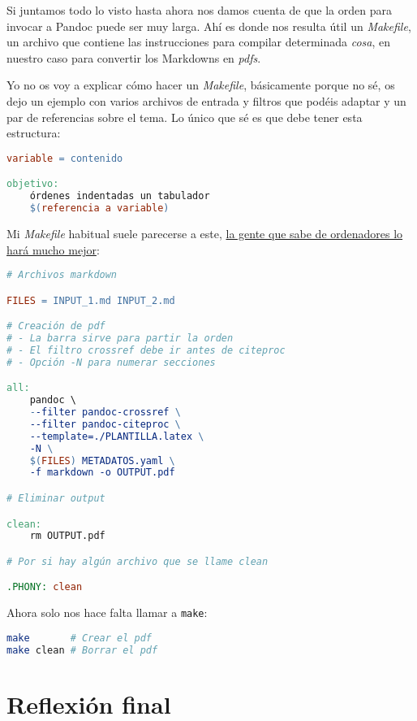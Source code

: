 Si juntamos todo lo visto hasta ahora nos damos cuenta de que la orden
para invocar a Pandoc puede ser muy larga. Ahí es donde nos resulta útil
un \emph{Makefile}, un archivo que contiene las instrucciones para
compilar determinada \emph{cosa}, en nuestro caso para convertir los
Markdowns en \emph{pdfs}.

Yo no os voy a explicar cómo hacer un \emph{Makefile}, básicamente
porque no sé, os dejo un ejemplo con varios archivos de entrada y
filtros que podéis adaptar y un par de referencias sobre el tema. Lo
único que sé es que debe tener esta estructura:

\begin{lstlisting}[language=make]
variable = contenido

objetivo:
    órdenes indentadas un tabulador
    $(referencia a variable)
\end{lstlisting}

Mi \emph{Makefile} habitual suele parecerse a este,
\href{https://gist.github.com/ekaitz-zarraga/f90f4c9c46a394e2048a\#file-makefile}{la
gente que sabe de ordenadores lo hará mucho mejor}:

\begin{lstlisting}[language=make]
# Archivos markdown

FILES = INPUT_1.md INPUT_2.md

# Creación de pdf
# - La barra sirve para partir la orden 
# - El filtro crossref debe ir antes de citeproc
# - Opción -N para numerar secciones

all: 
    pandoc \
    --filter pandoc-crossref \
    --filter pandoc-citeproc \
    --template=./PLANTILLA.latex \
    -N \
    $(FILES) METADATOS.yaml \
    -f markdown -o OUTPUT.pdf

# Eliminar output

clean:
    rm OUTPUT.pdf

# Por si hay algún archivo que se llame clean

.PHONY: clean 
\end{lstlisting}

Ahora solo nos hace falta llamar a \lstinline!make!:

\begin{lstlisting}[language=bash]
make       # Crear el pdf
make clean # Borrar el pdf
\end{lstlisting}

\section{Reflexión final}

